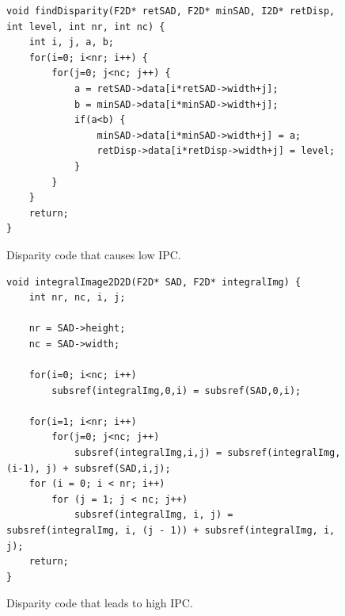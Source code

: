 \begin{figure}[t]
\lstset{language=C,numbersep=4pt}
\begin{center}
\begin{lstlisting}
void findDisparity(F2D* retSAD, F2D* minSAD, I2D* retDisp, int level, int nr, int nc) {
    int i, j, a, b;    
    for(i=0; i<nr; i++) {
        for(j=0; j<nc; j++) {
            a = retSAD->data[i*retSAD->width+j];
            b = minSAD->data[i*minSAD->width+j];
            if(a<b) {
                minSAD->data[i*minSAD->width+j] = a;
                retDisp->data[i*retDisp->width+j] = level;
            }
        }
    }
    return;
}
\end{lstlisting}
\end{center}
\vspace{-1em}
\caption{Disparity code that causes low IPC.}
\label{lst:low_ipc}
\end{figure}

\begin{figure}[t]
\lstset{language=C,numbersep=4pt}
\begin{center}
\begin{lstlisting}
void integralImage2D2D(F2D* SAD, F2D* integralImg) {
    int nr, nc, i, j;
    
    nr = SAD->height;
    nc = SAD->width;
	
    for(i=0; i<nc; i++)
        subsref(integralImg,0,i) = subsref(SAD,0,i);
    
    for(i=1; i<nr; i++)
        for(j=0; j<nc; j++) 
            subsref(integralImg,i,j) = subsref(integralImg, (i-1), j) + subsref(SAD,i,j);
	for (i = 0; i < nr; i++)
		for (j = 1; j < nc; j++)
            subsref(integralImg, i, j) = subsref(integralImg, i, (j - 1)) + subsref(integralImg, i, j);
    return;
}

\end{lstlisting}
\end{center}
\vspace{-1em}
\caption{Disparity code that leads to high IPC.}
\label{lst:high_ipc}
\end{figure}

